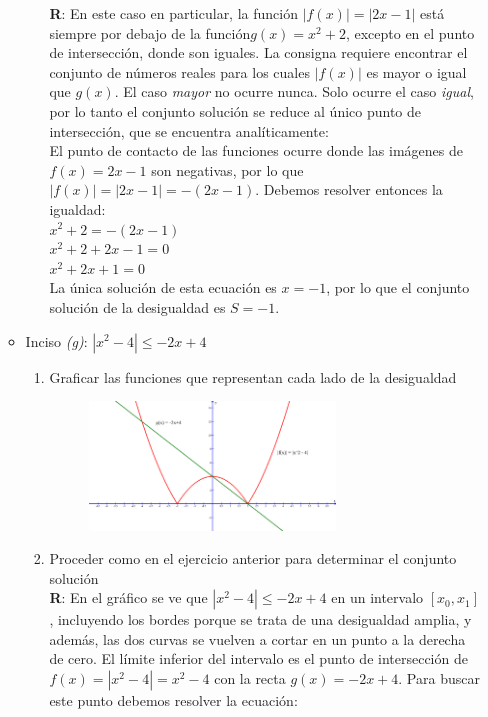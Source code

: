 \documentclass[12pt]{article}
\theoremstyle{definition}
\begin{document}
\begin{enumerate}
\begin{itemize}
\begin{enumerate}
	\textbf{R}: En este caso en particular, la función $|f(x)| =|2x-1|$ está siempre por debajo de la función$ g(x) =x^{2}+2 $, excepto en el punto de intersección, donde son iguales. La consigna requiere encontrar el conjunto de números reales para los 	cuales $|f(x)|$ es mayor o igual que $g(x)$. El caso \textit{mayor} no ocurre nunca. Solo ocurre el caso \textit{igual}, por lo tanto el conjunto solución se reduce al único punto de intersección, que se encuentra analíticamente:\\
	El punto de contacto de las funciones ocurre donde las imágenes de $f(x) = 2x-1$ son negativas, por lo que $|f(x)| =|2x-1|= 			-(2x-1)$. Debemos resolver entonces la igualdad:\\
	$ x^{2}+2 = -(2x-1)$ \\
	$ x^{2}+2  +2x-1 = 0$\\
	$ x^{2}+2x+1 = 0$ \\
	La única solución de esta ecuación es $x=-1$, por lo que el conjunto solución de la desigualdad es $S = {-1}$.
	\end{enumerate}
	\item Inciso \textit{(g)}: $ |x^{2}-4 |\leq -2x + 4$
	\begin{enumerate}
	\item Graficar las funciones que representan cada lado de la desigualdad
	\begin{figure}[H]
	\centering
	\includegraphics[width=0.7\textwidth]{31-3.png}
	\end{figure}
	\item Proceder como en el ejercicio anterior para determinar el conjunto solución\\
	\textbf{R}: En el gráfico se ve que  $ |x^{2}-4 |\leq -2x+4 $ en un intervalo $[x_0,x_1]$, incluyendo los bordes porque se 			trata de una desigualdad amplia, y además, las dos curvas se vuelven a cortar en un punto a la derecha de cero.
	El límite inferior del intervalo es el punto de intersección de $f(x) =|x^{2}-4| =  x^{2}-4$ con la recta $g(x) = -2x+4 $. Para 			buscar este punto debemos resolver la ecuación: \\

\end{enumerate}
\end{itemize}
\end{enumerate}
\end{document}
